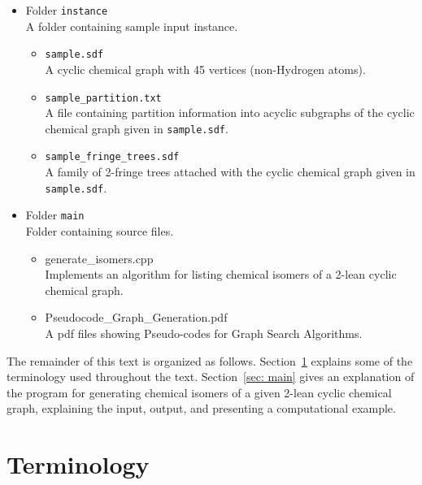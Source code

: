 \documentclass[11pt,titlepage,dvipdfmx,twoside]{article}
\begin{document}
\begin{itemize}
\begin{itemize}
\begin{itemize}
		\end{itemize}
	\item Folder {\tt instance}\\
		A folder containing sample input instance.
		\begin{itemize}
			\item{\tt sample.sdf}\\
			  A cyclic chemical graph with 45 vertices 
			  (non-Hydrogen atoms).
			\item{\tt sample\_partition.txt}\\
			  A file containing partition information into acyclic
			   subgraphs 
				of the cyclic chemical graph given in {\tt sample.sdf}.
			\item{\tt sample\_fringe\_trees.sdf}\\
			 	 A family of 2-fringe trees attached with the cyclic 
			 	 chemical graph given in {\tt sample.sdf}.
		\end{itemize}
	\item Folder {\tt main}\\
		Folder containing source files.
		\begin{itemize}
				
			\item{generate\_isomers.cpp}\\
				Implements an algorithm for listing chemical 
				isomers of
				a 2-lean cyclic chemical graph.
			
			\item{Pseudocode\_Graph\_Generation.pdf}\\
			  A pdf files showing Pseudo-codes for Graph Search Algorithms.
		\end{itemize}

	\end{itemize}
\end{itemize}

The remainder of this text is organized as follows.
Section~\ref{sec:term} explains some of the terminology used throughout the text.
Section~\ref{sec: main}
gives an explanation of the program for generating chemical isomers of
a given 2-lean cyclic chemical graph, explaining the input, output, and
presenting a computational example.



\section{Terminology}
\label{sec:term}
\end{document}
